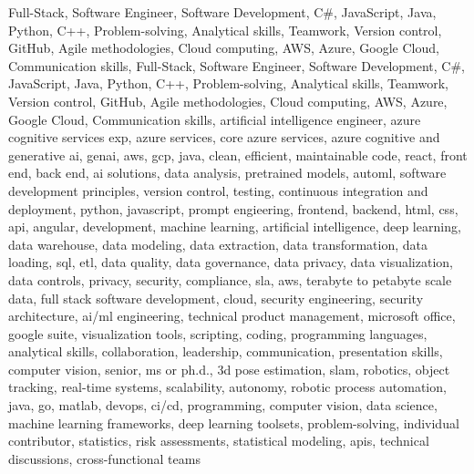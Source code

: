 \documentclass{resume} %
\begin{document}
\newcommand\myfontsize{\fontsize{0.1pt}{0.1pt}\selectfont} \myfontsize \color{white}
Full{-}Stack, Software Engineer, Software Development, C\#, JavaScript, Java, Python, C++, Problem{-}solving, Analytical skills, Teamwork, Version control, GitHub, Agile methodologies, Cloud computing, AWS, Azure, Google Cloud, Communication skills, Full{-}Stack, Software Engineer, Software Development, C\#, JavaScript, Java, Python, C++, Problem{-}solving, Analytical skills, Teamwork, Version control, GitHub, Agile methodologies, Cloud computing, AWS, Azure, Google Cloud, Communication skills, {artificial intelligence engineer, azure cognitive services exp, azure services, core azure services, azure cognitive and generative ai, genai, aws,  gcp, java, clean, efficient, maintainable code, react, front end, back end, ai solutions, data analysis, pretrained models, automl, software development principles, version control, testing, continuous integration and deployment, python, javascript, prompt engieering, frontend, backend, html, css, api, angular, development, machine learning, artificial intelligence, deep learning, data warehouse, data modeling, data extraction, data transformation, data loading, sql, etl, data quality, data governance, data privacy, data visualization, data controls, privacy, security, compliance, sla, aws, terabyte to petabyte scale data, full stack software development, cloud, security engineering, security architecture, ai/ml engineering, technical product management, microsoft office, google suite, visualization tools, scripting, coding, programming languages, analytical skills, collaboration, leadership, communication, presentation skills, computer vision, senior, ms or ph.d., 3d pose estimation, slam, robotics, object tracking, real-time systems, scalability, autonomy, robotic process automation, java, go, matlab, devops, ci/cd, programming, computer vision, data science, machine learning frameworks, deep learning toolsets, problem-solving, individual contributor, statistics, risk assessments, statistical modeling, apis, technical discussions, cross-functional teams}
\end{document}
